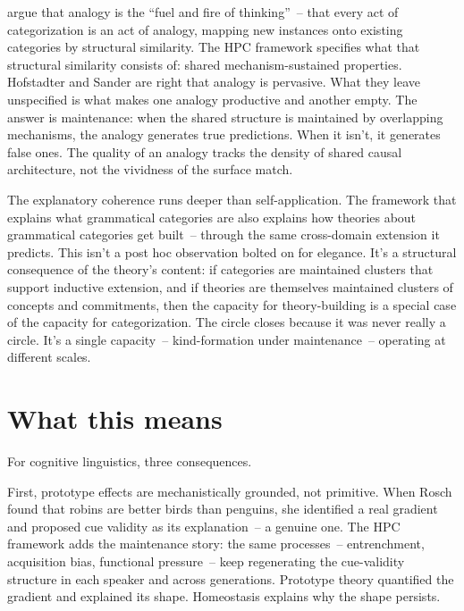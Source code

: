 \textcite{hofstadter2013} argue that analogy is the \enquote{fuel and fire of thinking}~-- that every act of categorization is an act of analogy, mapping new instances onto existing categories by structural similarity. The HPC framework specifies what that structural similarity consists of: shared mechanism-sustained properties. Hofstadter and Sander are right that analogy is pervasive. What they leave unspecified is what makes one analogy productive and another empty. The answer is maintenance: when the shared structure is maintained by overlapping mechanisms, the analogy generates true predictions. When it isn't, it generates false ones. The quality of an analogy tracks the density of shared causal architecture, not the vividness of the surface match.

The explanatory coherence runs deeper than self-application. The framework that explains what grammatical categories are also explains how theories about grammatical categories get built~-- through the same cross-domain extension it predicts. This isn't a post hoc observation bolted on for elegance. It's a structural consequence of the theory's content: if categories are maintained clusters that support inductive extension, and if theories are themselves maintained clusters of concepts and commitments, then the capacity for theory-building is a special case of the capacity for categorization. The circle closes because it was never really a circle. It's a single capacity~-- kind-formation under maintenance~-- operating at different scales.

\section{What this means}
\label{sec:16c:what-this-means}

For cognitive linguistics, three consequences.

First, prototype effects are mechanistically grounded, not primitive. When Rosch found that robins are better birds than penguins, she identified a real gradient and proposed cue validity as its explanation~-- a genuine one. The HPC framework adds the maintenance story: the same processes~-- entrenchment, acquisition bias, functional pressure~-- keep regenerating the cue-validity structure in each speaker and across generations. Prototype theory quantified the gradient and explained its shape. Homeostasis explains why the shape persists.

